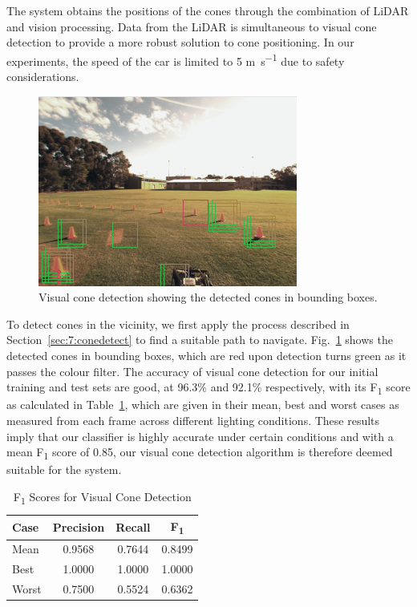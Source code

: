 The system obtains the positions of the cones through the combination of LiDAR and vision processing. Data from the LiDAR is simultaneous to visual cone detection to provide a more robust solution to cone positioning. In our experiments, the speed of the car is limited to 5 \si{\meter\per\second} due to safety considerations.  

\begin{figure}[H]
	\centering
	\includegraphics[width=0.7\linewidth]{svm2.png}
	\caption{Visual cone detection showing the detected cones in bounding boxes.}
	\label{fig:7:svm}
\end{figure}

To detect cones in the vicinity, we first apply the process described in Section~\ref{sec:7:conedetect} to find a suitable path to navigate. Fig.~\ref{fig:7:svm} shows the detected cones in bounding boxes, which are red upon detection turns green as it passes the colour filter. The accuracy of visual cone detection for our initial training and test sets are good, at 96.3\% and 92.1\% respectively, with its F\textsubscript{1} score as calculated in Table~\ref{tbl:7:cone}, which are given in their mean, best and worst cases as measured from each frame across different lighting conditions. These results imply that our classifier is highly accurate under certain conditions and with a mean F\textsubscript{1} score of 0.85, our visual cone detection algorithm is therefore deemed suitable for the system. 

\begin{table}[H]
	\caption{F\textsubscript{1} Scores for Visual Cone Detection}
	\label{tbl:7:cone}
	\centering
	\begin{tabular}{lccc}
		\toprule
		Case & Precision & Recall & F\textsubscript{1} \\
		\midrule
		Mean  & 0.9568 & 0.7644 & 0.8499 \\
		Best  & 1.0000 & 1.0000 & 1.0000 \\
		Worst & 0.7500 & 0.5524 & 0.6362 \\
		\bottomrule
	\end{tabular}
\end{table}

